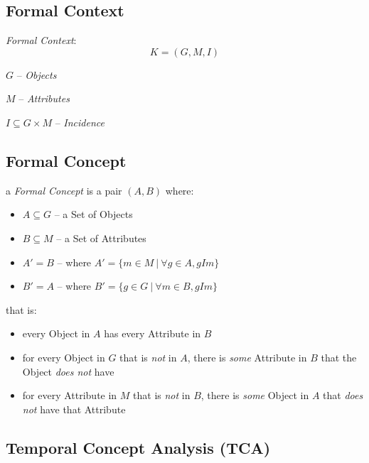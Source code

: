 \subsection{Formal Context}\label{sec:formal_context}

\emph{Formal Context}:
\[
  K = (G,M,I)
\]

$G$ -- \emph{Objects}

$M$ -- \emph{Attributes}

$I \subseteq G \times M$ -- \emph{Incidence}



\subsection{Formal Concept}\label{sec:formal_concept}

a \emph{Formal Concept} is a pair $(A,B)$ where:
\begin{itemize}
  \item $A \subseteq G$ -- a Set of Objects
  \item $B \subseteq M$ -- a Set of Attributes
  \item $A' = B$ -- where $A' = \{ m \in M \ |\ \forall g \in A, gIm \}$
  \item $B' = A$ -- where $B' = \{ g \in G \ |\ \forall m \in B, gIm \}$
\end{itemize}
that is:
\begin{itemize}
  \item every Object in $A$ has every Attribute in $B$
  \item for every Object in $G$ that is \emph{not} in $A$, there is
    \emph{some} Attribute in $B$ that the Object \emph{does not} have
  \item for every Attribute in $M$ that is \emph{not} in $B$, there is
    \emph{some} Object in $A$ that \emph{does not} have that Attribute
\end{itemize}



\subsection{Temporal Concept Analysis (TCA)}\label{sec:tca}
